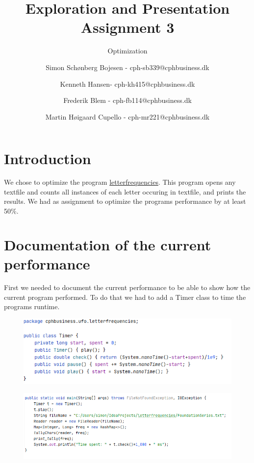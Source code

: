 \documentclass[parskip=full]{scrartcl}
\begin{document}
\begin{titlepage}
\title{Exploration and Presentation Assignment 3}
\subtitle{Optimization}
\author{Simon Schønberg Bojesen - cph-sb339@cphbusiness.dk
    \and Kenneth Hansen- cph-kh415@cphbusiness.dk
    \and Frederik Blem - cph-fb114@cphbusiness.dk
    \and Martin Høigaard Cupello - cph-mr221@cphbusiness.dk}
\maketitle
\thispagestyle{empty}
\end{titlepage}
\clearpage

\section{Introduction}
\label{sec:introduction} %
    We chose to optimize the program \href{https://github.com/CPHBusinessSoftUFO/letterfrequencies}{letterfrequencies}.
    This program opens any textfile and counts all instances of each letter occuring in textfile, and prints the results. We had as assignment to optimize the programs performance by at least 50\%.
\clearpage

\section{Documentation of the current performance}
\label{sec:currentdoc} 
    First we needed to document the current performance to be able to show how the current program performed. To do that we had to add a Timer class to time the programs runtime.

\begin{figure}[!h]
    \centering
    \includegraphics[width=\textwidth]{Timer.PNG}
\end{figure}


\begin{figure}[!h]
    \centering
    \includegraphics[width=\textwidth]{unchanged_code_added_timer.png}
\end{figure}
\end{document}
